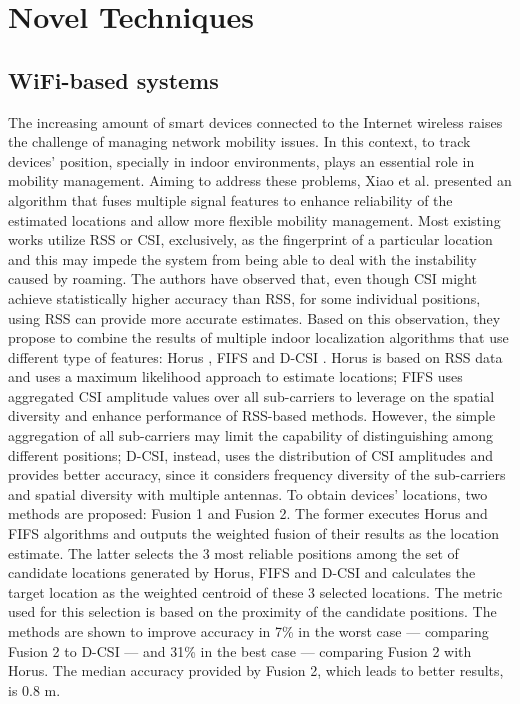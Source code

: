 \section{Novel Techniques}

\subsection{WiFi-based systems}
    The increasing amount of smart devices connected to the Internet wireless raises the challenge of managing network mobility issues. In this context, to track devices' position, specially in indoor environments, plays an essential role in mobility management. Aiming to address these problems, Xiao et al. \cite{Xiao2018} presented an algorithm that fuses multiple signal features to enhance reliability of the  estimated locations and allow more flexible mobility management.
    Most existing works utilize RSS or CSI, exclusively, as the fingerprint of a particular location and this may impede the system from being able to deal with the instability caused by roaming. The authors have observed that, even though CSI might achieve statistically higher accuracy than RSS, for some individual positions, using RSS can provide more accurate estimates. Based on this observation, they propose to combine the results of multiple indoor localization algorithms that use different type of features: Horus \cite{horus}, FIFS \cite{fifs} and D-CSI \cite{d-csi}. Horus is based on RSS data and uses a maximum likelihood approach to estimate locations; FIFS uses aggregated CSI amplitude values over all sub-carriers to leverage on the spatial diversity and enhance performance of RSS-based methods. However, the simple aggregation of all sub-carriers may limit the capability of distinguishing among different positions; D-CSI, instead, uses the distribution of CSI amplitudes and provides better accuracy, since it considers frequency diversity of the sub-carriers and spatial diversity with multiple antennas.
    To obtain devices' locations, two methods are proposed: Fusion 1 and Fusion 2. The former executes Horus and FIFS algorithms and outputs the weighted fusion of their results as the location estimate. The latter selects the 3 most reliable positions among the set of candidate locations generated by Horus, FIFS and D-CSI and calculates the target location as the weighted centroid of these 3 selected locations. The metric used for this selection is based on the proximity of the candidate positions. The methods are shown to improve accuracy in 7\% in the worst case — comparing Fusion 2 to D-CSI — and 31\% in the best case — comparing Fusion 2 with Horus. The median accuracy provided by Fusion 2, which leads to better results, is 0.8 m.
    
